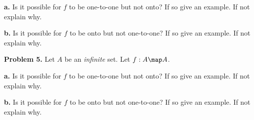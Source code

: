\documentclass[oneside,12pt]{amsart}
\begin{document}
\smallskip

\textbf{a.} Is it possible for $f$ to be one-to-one but not onto? If so
give an example. If not explain why.

\bigskip
\bigskip

\textbf{b.} Is it possible for $f$ to be onto but not one-to-one? If so
give an example. If not explain why.

\bigskip

\textbf{Problem 5.} Let $A$ be an \emph{infinite} set.
Let $f : A \map A$.

\smallskip

\textbf{a.} Is it possible for $f$ to be one-to-one but not onto? If so
give an example. If not explain why.

\bigskip
\bigskip

\textbf{b.} Is it possible for $f$ to be onto but not one-to-one? If so
give an example. If not explain why.
\end{document}
